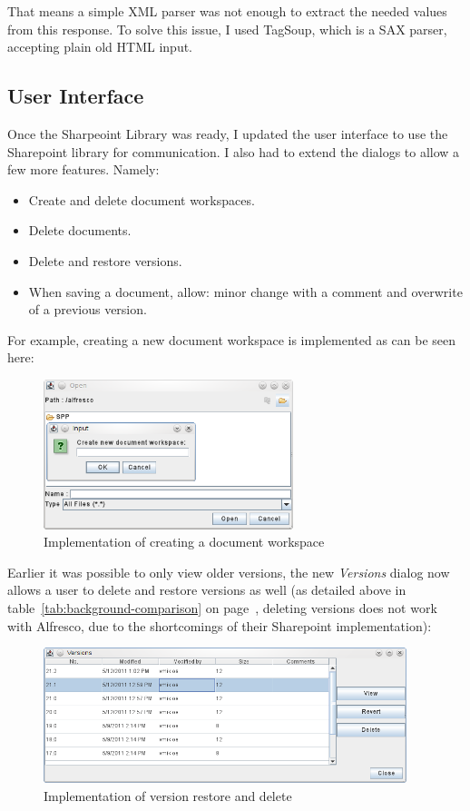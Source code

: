 That means a simple XML parser was not enough to extract the needed values from
this response. To solve this issue, I used TagSoup\cite{tagsoup}, which is a
SAX parser, accepting plain old HTML input.

\subsection{User Interface}

Once the Sharpeoint Library was ready, I updated the user interface to use the
Sharepoint library for communication. I also had to extend the dialogs to allow
a few more features. Namely:

\begin{itemize}
\item Create and delete document workspaces.
\item Delete documents.
\item Delete and restore versions.
\item When saving a document, allow: minor change with a comment and overwrite of a previous version.
\end{itemize}

For example, creating a new document workspace is implemented as can be seen
here:

\begin{figure}[H]
\centering
\includegraphics[width=275px,keepaspectratio]{implementation-createdws.png}
\caption{Implementation of creating a document workspace}
\end{figure}

Earlier it was possible to only view older versions, the new \emph{Versions}
dialog now allows a user to delete and restore versions as well (as detailed
above in table~\ref{tab:background-comparison} on
page~\pageref{tab:background-comparison}, deleting versions does not work with
Alfresco, due to the shortcomings of their Sharepoint implementation):

\begin{figure}[H]
\centering
\includegraphics[width=400px,keepaspectratio]{implementation-versiondialog.png}
\caption{Implementation of version restore and delete}
\end{figure}

